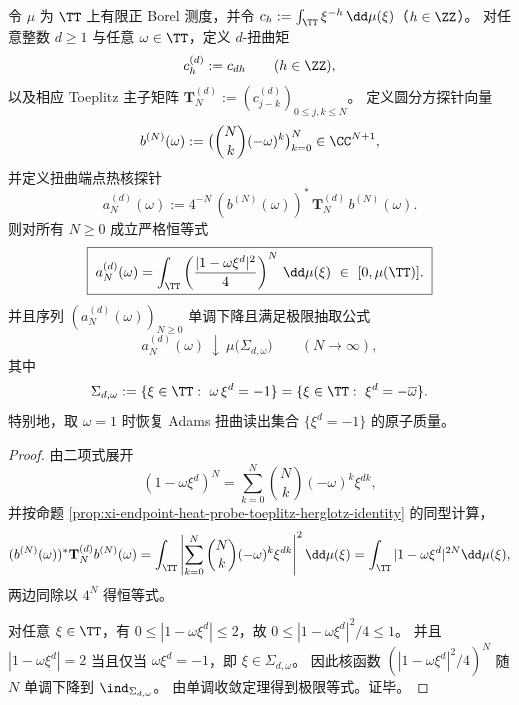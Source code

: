 
\begin{theorem}\label{thm:xi-endpoint-heat-probe-adams-twist-roots}
令 \(\mu\) 为 \(\TT\) 上有限正 Borel 测度，并令 \(c_h:=\int_{\TT}\xi^{-h}\,\dd\mu(\xi)\)（\(h\in\ZZ\)）。
对任意整数 \(d\ge 1\) 与任意 \(\omega\in\TT\)，定义 \(d\)-扭曲矩
\[
c^{(d)}_h:=c_{dh}\qquad(h\in\ZZ),
\]
以及相应 Toeplitz 主子矩阵
\(
\mathbf{T}^{(d)}_N:=(c^{(d)}_{j-k})_{0\le j,k\le N}
\)。
定义圆分方探针向量
\[
b^{(N)}(\omega):=\bigl(\binom Nk(-\omega)^k\bigr)_{k=0}^{N}\in\CC^{N+1},
\]
并定义扭曲端点热核探针
\[
a_N^{(d)}(\omega):=4^{-N}\,(b^{(N)}(\omega))^\ast\,\mathbf{T}^{(d)}_N\,b^{(N)}(\omega).
\]
则对所有 \(N\ge 0\) 成立严格恒等式
\[
\boxed{\;
a_N^{(d)}(\omega)=\int_{\TT}\left(\frac{|1-\omega\xi^{d}|^2}{4}\right)^{N}\,\dd\mu(\xi)\ \in\ [0,\mu(\TT)].\;}
\]
并且序列 \((a_N^{(d)}(\omega))_{N\ge 0}\) 单调下降且满足极限抽取公式
\[
\boxed{\;
a_N^{(d)}(\omega)\ \downarrow\ \mu\bigl(\Sigma_{d,\omega}\bigr)\qquad(N\to\infty),\;}
\]
其中
\[
\Sigma_{d,\omega}:=\{\xi\in\TT:\ \omega\,\xi^{d}=-1\}
=\{\xi\in\TT:\ \xi^{d}=-\overline{\omega}\}.
\]
特别地，取 \(\omega=1\) 时恢复 Adams 扭曲读出集合 \(\{\xi^d=-1\}\) 的原子质量。
\end{theorem}

\begin{proof}
由二项式展开
\[
(1-\omega\xi^{d})^N=\sum_{k=0}^{N}\binom Nk(-\omega)^k\xi^{dk},
\]
并按命题 \ref{prop:xi-endpoint-heat-probe-toeplitz-herglotz-identity} 的同型计算，
\[
(b^{(N)}(\omega))^\ast \mathbf{T}^{(d)}_N b^{(N)}(\omega)
=\int_{\TT}\left|\sum_{k=0}^{N}\binom Nk(-\omega)^k\xi^{dk}\right|^2\dd\mu(\xi)
=\int_{\TT}|1-\omega\xi^{d}|^{2N}\dd\mu(\xi),
\]
两边同除以 \(4^N\) 得恒等式。
\par
对任意 \(\xi\in\TT\)，有 \(0\le |1-\omega\xi^{d}|\le 2\)，故
\(
0\le |1-\omega\xi^{d}|^2/4\le 1
\)。
并且 \(|1-\omega\xi^{d}|=2\) 当且仅当 \(\omega\xi^{d}=-1\)，即 \(\xi\in\Sigma_{d,\omega}\)。
因此核函数 \(\left(|1-\omega\xi^{d}|^2/4\right)^N\) 随 \(N\) 单调下降到 \(\ind_{\Sigma_{d,\omega}}\)。
由单调收敛定理得到极限等式。证毕。
\end{proof}


